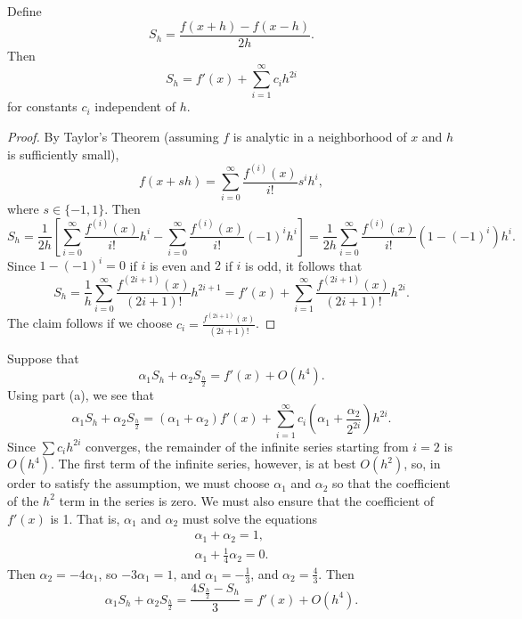 \documentclass{homework}
\begin{document}
	\begin{alphaparts}
		\questionpart Define
		\begin{equation}
			S_h = \frac{f(x+h) - f(x-h)}{2h}.
		\end{equation}
		Then
		\begin{equation}
			S_h = f'(x) + \sum_{i=1}^\infty c_ih^{2i}
		\end{equation}
		for constants $c_i$ independent of $h$.
		\begin{proof}
			By Taylor's Theorem (assuming $f$ is analytic in a neighborhood of $x$ and $h$ is sufficiently small),
			\begin{equation}
				f(x + sh) = \sum_{i=0}^\infty \frac{f^{(i)}(x)}{i!}s^ih^i,
			\end{equation}
			where $s \in \{-1,1\}$. Then
			\begin{equation}
				S_h = \frac{1}{2h}\left[\sum_{i=0}^\infty \frac{f^{(i)}(x)}{i!}h^i - \sum_{i=0}^\infty \frac{f^{(i)}(x)}{i!}(-1)^ih^i\right] = \frac{1}{2h}\sum_{i=0}^\infty \frac{f^{(i)}(x)}{i!}\left(1 - (-1)^i\right)h^i.
			\end{equation}
			Since $1- (-1)^i = 0$ if $i$ is even and $2$ if $i$ is odd, it follows that
			\begin{equation}
				S_h = \frac{1}{h}\sum_{i=0}^\infty \frac{f^{(2i+1)}(x)}{(2i+1)!}h^{2i+1} = f'(x) + \sum_{i=1}^\infty \frac{f^{(2i+1)}(x)}{(2i+1)!}h^{2i}.
			\end{equation}
			The claim follows if we choose $c_i = \frac{f^{(2i+1)}(x)}{(2i+1)!}$.
		\end{proof}
		
		\questionpart Suppose that
		\begin{equation}
			\alpha_1 S_h + \alpha_2 S_{\frac{h}{2}} = f'(x) + O(h^4).
		\end{equation}
		Using part (a), we see that
		\begin{equation}
			\alpha_1 S_h + \alpha_2 S_\frac{h}{2} = (\alpha_1 + \alpha_2)f'(x) + \sum_{i=1}^\infty c_i\left(\alpha_1 + \frac{\alpha_2}{2^{2i}}\right)h^{2i}.
		\end{equation}
		Since $\sum c_i h^{2i}$ converges, the remainder of the infinite series starting from $i = 2$ is $O(h^4)$. The first term of the infinite series, however, is at best $O(h^2)$, so, in order to satisfy the assumption, we must choose $\alpha_1$ and $\alpha_2$ so that the coefficient of the $h^2$ term in the series is zero. We must also ensure that the coefficient of $f'(x)$ is 1. That is, $\alpha_1$ and $\alpha_2$ must solve the equations
		\begin{align}
			\alpha_1 + \alpha_2 = 1, \\
			\alpha_1 + \frac{1}{4}\alpha_2 = 0.
		\end{align}
		Then $\alpha_2 = -4\alpha_1$, so $-3\alpha_1 = 1$, and $\alpha_1 = -\frac{1}{3}$, and $\alpha_2 = \frac{4}{3}$. Then
		\begin{equation}
			\alpha_1S_h + \alpha_2S_\frac{h}{2} = \frac{4S_\frac{h}{2} - S_h}{3} = f'(x) + O(h^4).
		\end{equation}
	\end{alphaparts}
\end{document}

